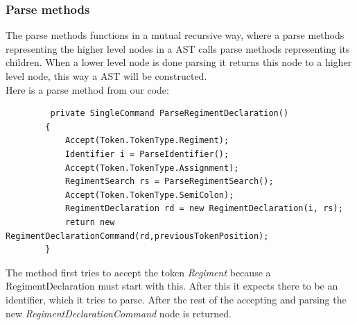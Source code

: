 		\subsubsection{Parse methods}
			\label{parsemethods}
			The parse methods functions in a mutual recursive way, where a parse methods representing the higher level nodes in a 
			AST calls parse methods representing its children. When a lower level node is done parsing it returns this node to a higher level node,
			this way a AST will be constructed. \\
			Here is a parse method from our code:
			\begin{lstlisting}
		 private SingleCommand ParseRegimentDeclaration()
        {
            Accept(Token.TokenType.Regiment);
            Identifier i = ParseIdentifier();
            Accept(Token.TokenType.Assignment);
            RegimentSearch rs = ParseRegimentSearch();
            Accept(Token.TokenType.SemiColon);
            RegimentDeclaration rd = new RegimentDeclaration(i, rs);
            return new RegimentDeclarationCommand(rd,previousTokenPosition);
        }
			\end{lstlisting}
			The method first tries to accept the token {\it Regiment} because a RegimentDeclaration must start with this. 
			After this it expects there to be an identifier, which it tries to parse. After the rest of the accepting and parsing the new 
			{\it RegimentDeclarationCommand} node is returned.
		
		